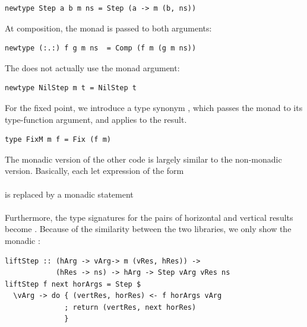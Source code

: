 \documentclass[preprint,natbib]{sigplanconf}
\begin{document}
\begin{small}
\begin{verbatim}
newtype Step a b m ns = Step (a -> m (b, ns))
\end{verbatim}
\end{small}

At composition, the monad is passed to both arguments:

\begin{small}
\begin{verbatim}
newtype (:.:) f g m ns  = Comp (f m (g m ns))
\end{verbatim}
\end{small}

The  does not actually use the monad argument:

\begin{small}
\begin{verbatim}
newtype NilStep m t = NilStep t
\end{verbatim}
\end{small}

For the fixed point, we introduce a type synonym , which passes the monad to its type-function argument, and applies  to the result.

\begin{small}
\begin{verbatim}
type FixM m f = Fix (f m)
\end{verbatim}
\end{small}

The monadic version of the other code is largely similar to the non-monadic version. Basically, each let expression of the form\\

\noindent
{}\\

is replaced by a monadic statement\\

\noindent
{}\\

Furthermore, the type signatures for the pairs of horizontal and vertical results  become . Because of the similarity between the two libraries, we only show the monadic :

\begin{small}
\begin{verbatim}
liftStep :: (hArg -> vArg-> m (vRes, hRes)) -> 
            (hRes -> ns) -> hArg -> Step vArg vRes ns
liftStep f next horArgs = Step $ 
  \vArg -> do { (vertRes, horRes) <- f horArgs vArg
              ; return (vertRes, next horRes)
              }
\end{verbatim}
\end{small}%
\end{document}
